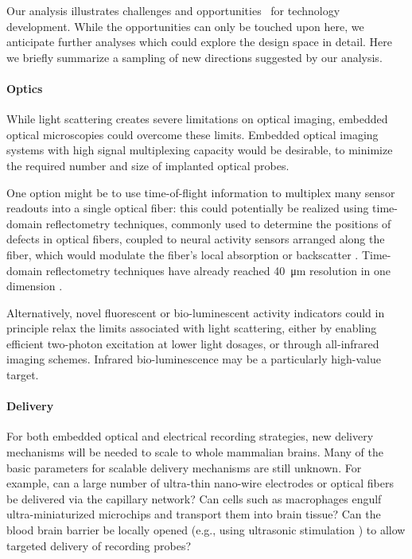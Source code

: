 Our analysis illustrates challenges and opportunities~\cite{Dean2013} for technology development. While the opportunities can only be touched upon here, we anticipate further analyses which could explore the design space in detail. Here we briefly summarize a sampling of new directions suggested by our analysis.

\paragraph{Optics} While light scattering creates severe limitations on optical imaging, embedded optical microscopies could overcome these limits. Embedded optical imaging systems with high signal multiplexing capacity would be desirable, to minimize the required number and size of implanted optical probes. 

One option might be to use time-of-flight information to multiplex many sensor readouts into a single optical fiber: this could potentially be realized using time-domain reflectometry techniques, commonly used to determine the positions of defects in optical fibers, coupled to neural activity sensors arranged along the fiber, which would modulate the fiber's local absorption or backscatter \cite{WoodInPreparation}. Time-domain reflectometry techniques have already reached \SI{40}{\micro\meter} resolution in one dimension \cite{Lamy1981fi}.

Alternatively, novel fluorescent or bio-luminescent activity indicators could in principle relax the limits associated with light scattering, either by enabling efficient two-photon excitation at lower light dosages, or through all-infrared imaging schemes. Infrared bio-luminescence may be a particularly high-value target.

\paragraph{Delivery} For both embedded optical and electrical recording strategies, new delivery mechanisms will be needed to scale to whole mammalian brains. Many of the basic parameters for scalable delivery mechanisms are still unknown. For example, can a large number of ultra-thin nano-wire electrodes or optical fibers be delivered via the capillary network? Can cells such as macrophages engulf ultra-miniaturized microchips and transport them into brain tissue? Can the blood brain barrier be locally opened (e.g., using ultrasonic stimulation \cite{hynynen2005local}) to allow targeted delivery of recording probes?

